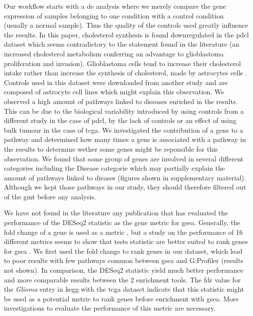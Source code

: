 Our workflow starts with a \acrlong{de} analysis where we merely compare the gene expression of samples belonging to one condition with a control condition (usually a normal sample).
Thus the quality of the controls used greatly influence the results.
In this paper, cholesterol synthesis is found downregulated in the \acrshort{pdcl} dataset which seems contradictory to the statement found in the literature (an increased cholesterol metabolism conferring an advantage to glioblastoma proliferation and invasion).
Glioblastoma cells tend to increase their cholesterol intake rather than increase the synthesis of cholesterol, made by astrocytes cells \cite*{Villa2016, Pirmoradi2019}.
Controls used in this dataset were downloaded from another study and are composed of astrocyte cell lines which might explain this observation.
We observed a high amount of pathways linked to diseases enriched in the results.
This can be due to the biological variability introduced by using controls from a different study in the case of \acrshort{pdcl}, by the lack of controls or an effect of using bulk tumour in the case of \acrshort{tcga}.
We investigated the contribution of a gene to a pathway and determined how many times a gene is associated with a pathway in the results to determine wether some genes might be reponsible for this observation.
We found that some group of genes are involved in several different categories including the Disease categorie which may partially explain the amount of pathways linked to dieases (figures shown in supplementary material).
Although we kept those pathways in our study, they should therefore filtered out of the \acrshort{gmt} before any analysis.

We have not found in the literature any publication that has evaluated the performance of the DESeq2 statistic as the gene metric for \acrshort{gsea}.
Generally, the fold change of a gene is used as a metric \cite*{Reimand2019}, but a study on the performance of 16 different metrics seems to show that tests statistic are better suited to rank genes for \acrshort{gsea} \cite*{Zyla2017}.
We first used the fold change to rank genes in our dataset, which lead to poor results with few pathways common between \acrshort{gsea} and G:Profiler (results not shown).
In comparison, the DESeq2 statistic yield much better performance and more comparable results between the 2 enrichment tools.
The \acrshort{fdr} value for the \textit{Glioma} entry in \acrshort{kegg} with the \acrshort{tcga} dataset indicate that this statistic might be used as a potential metric to rank genes before enrichment with \acrshort{gsea}.
More investigations to evaluate the performance of this metric are necessary.

